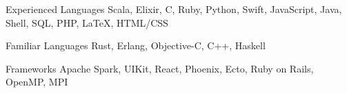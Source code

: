 

\begin{cvskills}

  \cvskill
  {Experienced Languages} %
  {Scala, Elixir, C, Ruby, Python, Swift, JavaScript, Java, Shell, SQL, PHP, \LaTeX, HTML/CSS} %

  \cvskill
  {Familiar Languages} %
  {Rust, Erlang, Objective-C, C++, Haskell} %

  \cvskill
  {Frameworks} %
  {Apache Spark, UIKit, React, Phoenix, Ecto, Ruby on Rails, OpenMP, MPI} %



\end{cvskills}
